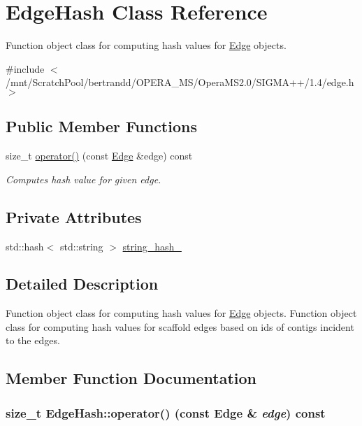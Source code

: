 \hypertarget{classEdgeHash}{
\section{EdgeHash Class Reference}
\label{classEdgeHash}
}


Function object class for computing hash values for \hyperlink{classEdge}{Edge} objects.  


{\ttfamily \#include $<$/mnt/ScratchPool/bertrandd/OPERA\_\-MS/OperaMS2.0/SIGMA++/1.4/edge.h$>$}\subsection*{Public Member Functions}
\begin{DoxyCompactItemize}
\item 
size\_\-t \hyperlink{classEdgeHash_a508a037c057f0fc8b6ce38cc14aa24be}{operator()} (const \hyperlink{classEdge}{Edge} \&edge) const 
\begin{DoxyCompactList}\small\item\em Computes hash value for given edge. \item\end{DoxyCompactList}\end{DoxyCompactItemize}
\subsection*{Private Attributes}
\begin{DoxyCompactItemize}
\item 
std::hash$<$ std::string $>$ \hyperlink{classEdgeHash_ad792d3023aeb1aa2b561e6b3a777f992}{string\_\-hash\_\-}
\end{DoxyCompactItemize}


\subsection{Detailed Description}
Function object class for computing hash values for \hyperlink{classEdge}{Edge} objects. Function object class for computing hash values for scaffold edges based on ids of contigs incident to the edges. 

\subsection{Member Function Documentation}
\hypertarget{classEdgeHash_a508a037c057f0fc8b6ce38cc14aa24be}{
\subsubsection[{operator()}]{\setlength{\rightskip}{0pt plus 5cm}size\_\-t EdgeHash::operator() (const {\bf Edge} \& {\em edge}) const}}
\label{classEdgeHash_a508a037c057f0fc8b6ce38cc14aa24be}


